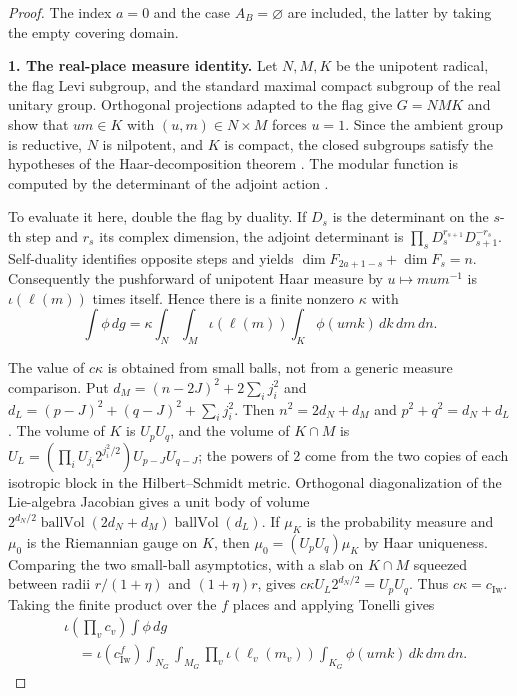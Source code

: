 \begin{proof}[Proof]
The index $a=0$ and the case $A_B=\varnothing$ are included, the latter
by taking the empty covering domain.

\textbf{1. The real-place measure identity.} Let $N,M,K$ be the
unipotent radical, the flag Levi subgroup, and the standard maximal
compact subgroup of the real unitary group. Orthogonal projections
adapted to the flag give $G=NMK$ and show that $um\in K$ with
$(u,m)\in N\times M$ forces $u=1$. Since the ambient group is
reductive, $N$ is nilpotent, and $K$ is compact, the closed subgroups
satisfy the hypotheses of the Haar-decomposition theorem
\cite[Theorem 8.32 and Corollary 8.31]{Knapp}. The modular function is
computed by the determinant of
the adjoint action \cite[Proposition 8.27]{Knapp}.

To evaluate it here, double the flag by duality. If $D_s$ is the
determinant on the $s$-th step and $r_s$ its complex dimension, the
adjoint determinant is
$\prod_sD_s^{r_{s+1}}D_{s+1}^{-r_s}$. Self-duality identifies opposite
steps and yields $\dim F_{2a+1-s}+\dim F_s=n$. Consequently the
pushforward of unipotent Haar measure by $u\mapsto mum^{-1}$ is
$\iota(\ell(m))$ times itself. Hence there is a finite nonzero
$\kappa$ with
\[
 \int\phi\,dg=\kappa\int_N\int_M\iota(\ell(m))
 \int_K\phi(umk)\,dk\,dm\,dn.
\]

The value of $c\kappa$ is obtained from small balls, not from a generic
measure comparison. Put $d_M=(n-2J)^2+2\sum_ij_i^2$ and
$d_L=(p-J)^2+(q-J)^2+\sum_ij_i^2$. Then
$n^2=2d_N+d_M$ and $p^2+q^2=d_N+d_L$. The volume of $K$ is $U_pU_q$,
and the volume of $K\cap M$ is
$U_L=(\prod_iU_{j_i}2^{j_i^2/2})U_{p-J}U_{q-J}$; the powers of $2$
come from the two copies of each isotropic block in the
Hilbert--Schmidt metric. Orthogonal diagonalization of the Lie-algebra
Jacobian gives a unit body of volume
$2^{d_N/2}\operatorname{ballVol}(2d_N+d_M)
 \operatorname{ballVol}(d_L)$. If $\mu_K$ is the probability measure
and $\mu_0$ is the Riemannian gauge on $K$, then
$\mu_0=(U_pU_q)\mu_K$ by Haar uniqueness. Comparing the two small-ball
asymptotics, with a slab on $K\cap M$ squeezed between radii
$r/(1+\eta)$ and $(1+\eta)r$, gives
$c\kappa U_L2^{d_N/2}=U_pU_q$. Thus $c\kappa=c_{\mathrm{Iw}}$. Taking
the finite product over the $f$ places and applying Tonelli gives
\begin{equation}\label{eq:iwasawa-product}
\begin{split}
&\iota\!\left(\prod_vc_v\right)\int\phi\,dg\\
&\quad=\iota(c_{\mathrm{Iw}}^f)\int_{N_G}\int_{M_G}
 \prod_v\iota(\ell_v(m_v))\int_{K_G}\phi(umk)\,dk\,dm\,dn .
\end{split}
\end{equation}


\end{proof}
